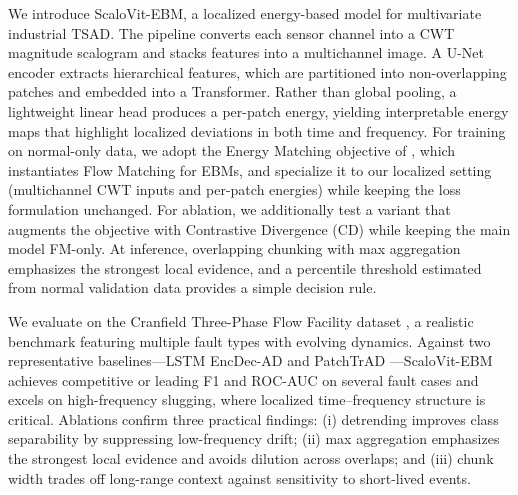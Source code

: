 \documentclass{article}
\begin{document}
We introduce ScaloVit-EBM, a localized energy-based model for multivariate industrial TSAD. The pipeline converts each sensor channel into a CWT magnitude scalogram and stacks features into a multichannel image. A U-Net encoder extracts hierarchical features, which are partitioned into non-overlapping patches and embedded into a Transformer. Rather than global pooling, a lightweight linear head produces a per-patch energy, yielding interpretable energy maps that highlight localized deviations in both time and frequency. For training on normal-only data, we adopt the Energy Matching objective of \citet{balcerak2025energymatchingunifyingflow}, which instantiates Flow Matching \citep{lipman_2023} for EBMs, and specialize it to our localized setting (multichannel CWT inputs and per-patch energies) while keeping the loss formulation unchanged. For ablation, we additionally test a variant that augments the objective with Contrastive Divergence (CD) while keeping the main model FM-only. At inference, overlapping chunking with max aggregation emphasizes the strongest local evidence, and a percentile threshold estimated from normal validation data provides a simple decision rule.

We evaluate on the Cranfield Three-Phase Flow Facility dataset \citep{cao_mba_lao_samuel_2015}, a realistic benchmark featuring multiple fault types with evolving dynamics. Against two representative baselines—LSTM EncDec-AD \citep{malhotra_ramakrishnan_anand_vig_agarwal_shroff_2016} and PatchTrAD \citep{vilhes_gasso_alaya_2025}—ScaloVit-EBM achieves competitive or leading F1 and ROC-AUC on several fault cases and excels on high-frequency slugging, where localized time–frequency structure is critical. Ablations confirm three practical findings: (i) detrending improves class separability by suppressing low-frequency drift; (ii) max aggregation emphasizes the strongest local evidence and avoids dilution across overlaps; and (iii) chunk width trades off long-range context against sensitivity to short-lived events.
\end{document}
